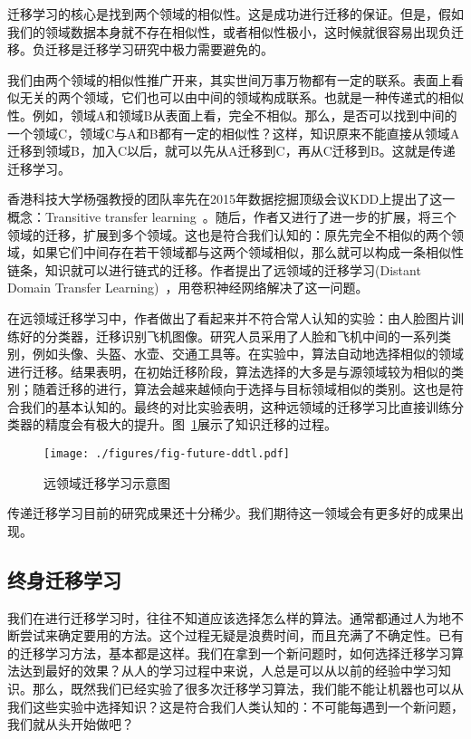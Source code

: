 迁移学习的核心是找到两个领域的相似性。这是成功进行迁移的保证。但是，假如我们的领域数据本身就不存在相似性，或者相似性极小，这时候就很容易出现负迁移。负迁移是迁移学习研究中极力需要避免的。

我们由两个领域的相似性推广开来，其实世间万事万物都有一定的联系。表面上看似无关的两个领域，它们也可以由中间的领域构成联系。也就是一种传递式的相似性。例如，领域A和领域B从表面上看，完全不相似。那么，是否可以找到中间的一个领域C，领域C与A和B都有一定的相似性？这样，知识原来不能直接从领域A迁移到领域B，加入C以后，就可以先从A迁移到C，再从C迁移到B。这就是传递迁移学习。

香港科技大学杨强教授的团队率先在2015年数据挖掘顶级会议KDD上提出了这一概念：Transitive transfer learning~\cite{tan2015transitive}。随后，作者又进行了进一步的扩展，将三个领域的迁移，扩展到多个领域。这也是符合我们认知的：原先完全不相似的两个领域，如果它们中间存在若干领域都与这两个领域相似，那么就可以构成一条相似性链条，知识就可以进行链式的迁移。作者提出了远领域的迁移学习(Distant Domain Transfer Learning)~\cite{tan2017distant}，用卷积神经网络解决了这一问题。

在远领域迁移学习中，作者做出了看起来并不符合常人认知的实验：由人脸图片训练好的分类器，迁移识别飞机图像。研究人员采用了人脸和飞机中间的一系列类别，例如头像、头盔、水壶、交通工具等。在实验中，算法自动地选择相似的领域进行迁移。结果表明，在初始迁移阶段，算法选择的大多是与源领域较为相似的类别；随着迁移的进行，算法会越来越倾向于选择与目标领域相似的类别。这也是符合我们的基本认知的。最终的对比实验表明，这种远领域的迁移学习比直接训练分类器的精度会有极大的提升。图~\ref{fig-future-ddtl}展示了知识迁移的过程。

\begin{figure}[htbp]
	\centering
	\texttt{[image: ./figures/fig-future-ddtl.pdf]}
	\caption{远领域迁移学习示意图}
	\label{fig-future-ddtl}
\end{figure}

传递迁移学习目前的研究成果还十分稀少。我们期待这一领域会有更多好的成果出现。

\subsection{终身迁移学习}

我们在进行迁移学习时，往往不知道应该选择怎么样的算法。通常都通过人为地不断尝试来确定要用的方法。这个过程无疑是浪费时间，而且充满了不确定性。已有的迁移学习方法，基本都是这样。我们在拿到一个新问题时，如何选择迁移学习算法达到最好的效果？从人的学习过程中来说，人总是可以从以前的经验中学习知识。那么，既然我们已经实验了很多次迁移学习算法，我们能不能让机器也可以从我们这些实验中选择知识？这是符合我们人类认知的：不可能每遇到一个新问题，我们就从头开始做吧？

